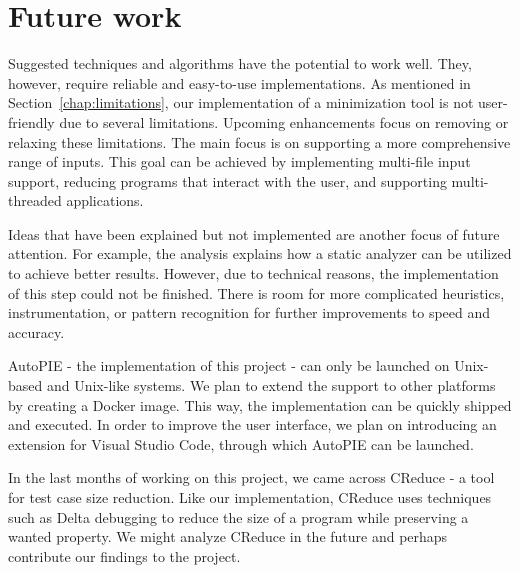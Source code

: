 \section{Future work}

Suggested techniques and algorithms have the potential to work well. 
They, however, require reliable and easy-to-use implementations. 
As mentioned in Section~\ref{chap:limitations}, our implementation of 
a minimization tool is not user-friendly due to several limitations. 
Upcoming enhancements focus on removing or relaxing these limitations. 
The main focus is on supporting a more comprehensive range of inputs. 
This goal can be achieved by implementing multi-file input support, reducing 
programs that interact with the user, and supporting multi-threaded 
applications.

Ideas that have been explained but not implemented are another focus of 
future attention. 
For example, the analysis explains how a static analyzer can be utilized to 
achieve better results. 
However, due to technical reasons, the implementation of this step could not 
be finished. 
There is room for more complicated heuristics, instrumentation, or pattern 
recognition for further improvements to speed and accuracy.

AutoPIE - the implementation of this project - can only be launched on 
Unix-based and Unix-like systems. 
We plan to extend the support to other platforms by creating a Docker image. 
This way, the implementation can be quickly shipped and executed. 
In order to improve the user interface, we plan on introducing an extension 
for Visual Studio Code, through which AutoPIE can be launched.

In the last months of working on this project, we came across CReduce - 
a tool for test case size reduction. 
Like our implementation, CReduce uses techniques such as Delta debugging to 
reduce the size of a program while preserving a wanted property. 
We might analyze CReduce in the future and perhaps contribute our findings 
to the project.
